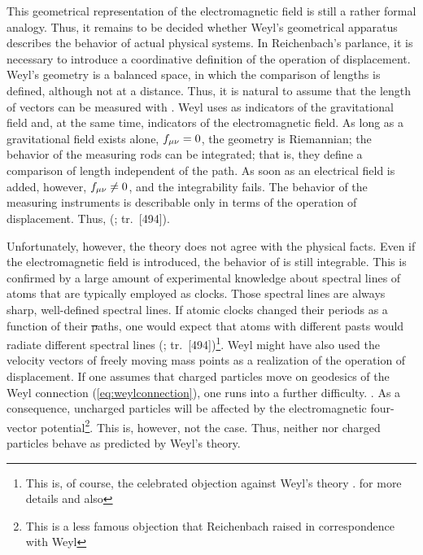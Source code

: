 \documentclass[final]{article}
\newcommand{\faradaymn}{\ensuremath{f\mn}}
\renewcommand{\rzlap}[2]{(\cite[#1]{Reichenbach1928}; tr.\ [#2])\xspace}
\begin{document}
This geometrical representation of the electromagnetic field is still a rather formal analogy. Thus, it remains to be decided whether Weyl's geometrical apparatus describes the behavior of actual physical systems. In Reichenbach's parlance, it is necessary to introduce a coordinative definition of the operation of displacement. Weyl's geometry is a balanced space, in which the comparison of lengths is defined, although not at a distance. Thus, it is natural to assume that the length of vectors can be measured with \rac. Weyl uses \rac as indicators of the gravitational field and, at the same time, indicators of the electromagnetic field. As long as a gravitational field exists alone, $\faradaymn=0$, the geometry is Riemannian; the behavior of the measuring rods can be integrated; that is, they define a comparison of length independent of the path. As soon as an electrical field is added, however, $\faradaymn\neq 0$, and the integrability fails. The behavior of the measuring instruments is describable only in terms of the operation of displacement. Thus,  \rzlap{354}{494}. 

Unfortunately, however, the theory does not agree with the physical facts. Even if the electromagnetic field is introduced, the behavior of \rac is still integrable. This is confirmed by a large amount of experimental knowledge about spectral lines of atoms that are typically employed as clocks. Those spectral lines are always sharp, well-defined spectral lines. If atomic clocks changed their periods as a function of their \st paths, one would expect that atoms with different pasts would radiate different spectral lines \rzlap{355}{494}\footnote{This is, of course, the celebrated objection against Weyl's theory .  for more details and also }. Weyl might have also used the velocity vectors of freely moving mass points as a realization of the operation of displacement. If one assumes that charged particles move on geodesics of the Weyl connection (\cref{eq:weylconnection}), one runs into a further difficulty. . As a consequence, uncharged particles will be affected by the electromagnetic four-vector potential\footnote{This is a less famous objection that Reichenbach raised in correspondence with Weyl }. This is, however, not the case. Thus, neither \rac nor charged particles behave as predicted by Weyl's theory. 
\end{document}
